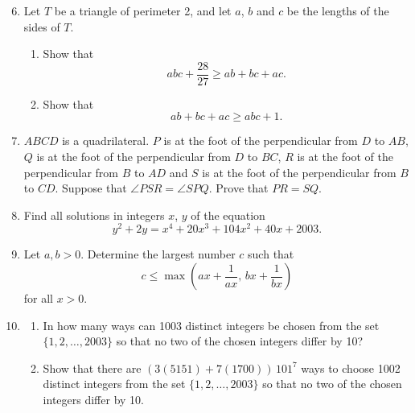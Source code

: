 \documentclass[12pt]{article}
\begin{document}
\begin{enumerate}
\setcounter{enumi}{5}
\item Let $T$ be a triangle of perimeter 2, and let $a$, $b$ and $c$ be the lengths of the sides of $T$.
\begin{enumerate}
\item[(a)] Show that
\[
abc + \frac{28}{27} \geq ab + bc + ac.
\]
\item[(b)] Show that
\[
ab + bc + ac \geq abc + 1.
\]
\end{enumerate}

\item $ABCD$ is a quadrilateral. $P$ is at the foot of the perpendicular from $D$ to $AB$, $Q$ is at the foot of the perpendicular from $D$ to $BC$, $R$ is at the foot of the perpendicular from $B$ to $AD$ and $S$ is at the foot of the perpendicular from $B$ to $CD$. Suppose that $\angle PSR = \angle SPQ$. Prove that $PR = SQ$.

\item Find all solutions in integers $x$, $y$ of the equation
\[
y^2 + 2y = x^4 + 20x^3 + 104x^2 + 40x + 2003.
\]

\item Let $a, b > 0$. Determine the largest number $c$ such that
\[
c \leq \max\!\left(ax + \frac{1}{ax},\, bx + \frac{1}{bx}\right)
\]
for all $x > 0$.

\item \begin{enumerate}
\item[(a)] In how many ways can 1003 distinct integers be chosen from the set $\{1, 2, \ldots, 2003\}$ so that no two of the chosen integers differ by 10?
\item[(b)] Show that there are $(3(5151) + 7(1700))\,101^7$ ways to choose 1002 distinct integers from the set $\{1, 2, \ldots, 2003\}$ so that no two of the chosen integers differ by 10.
\end{enumerate}

\end{enumerate}
\end{document}
